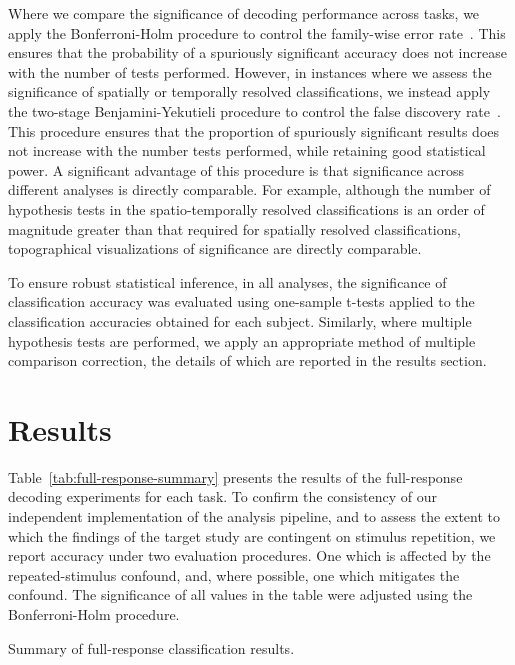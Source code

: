 Where we compare the significance of decoding performance across tasks, we apply the Bonferroni-Holm procedure to control the family-wise error rate~\citep{Holm:1979}. This ensures that the probability of a spuriously significant accuracy does not increase with the number of tests performed. However, in instances where we assess the significance of spatially or temporally resolved classifications, we instead apply the two-stage Benjamini-Yekutieli procedure to control the false discovery rate~\citep{Benjamini:2006}. This procedure ensures that the proportion of spuriously significant results does not increase with the number tests performed, while retaining good statistical power. A significant advantage of this procedure is that significance across different analyses is directly comparable. For example, although the number of hypothesis tests in the spatio-temporally resolved classifications is an order of magnitude greater than that required for spatially resolved classifications, topographical visualizations of significance are directly comparable.


To ensure robust statistical inference, in all analyses, the significance of classification accuracy was evaluated using one-sample t-tests applied to the classification accuracies obtained for each subject. Similarly, where multiple hypothesis tests are performed, we apply an appropriate method of multiple comparison correction, the details of which are reported in the results section.

\section{Results}
Table~\ref{tab:full-response-summary} presents the results of the full-response decoding experiments for each task. To confirm the consistency of our independent implementation of the analysis pipeline, and to assess the extent to which the findings of the target study are contingent on stimulus repetition, we report accuracy under two evaluation procedures. One which is affected by the repeated-stimulus confound, and, where possible, one which mitigates the confound. The significance of all values in the table were adjusted using the Bonferroni-Holm procedure.

\begin{table}
    \caption{Summary of full-response classification results.\label{tab:full-response-summary}}
        
\end{table}

